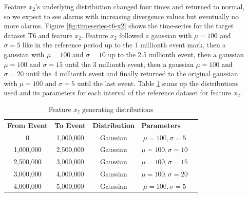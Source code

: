 Feature $x_2$'s underlying distribution changed four times and returned to normal, so we expect to see alarms with increasing divergence values but eventually no more alarms. Figure \ref{fig:timeseries-t6-x2} shows the time-series for the target dataset T6 and feature $x_2$. Feature $x_2$ followed a gaussian with $\mu=100$ and $\sigma=5$ like in the reference period up to the 1 millionth event mark, then a gaussian with $\mu=100$ and $\sigma=10$ up to the 2.5 millionth event, then a gaussian $\mu=100$ and $\sigma=15$ until the 3 millionth event, then a gaussian $\mu=100$ and $\sigma=20$ until the 4 millionth event and finally returned to the original gaussian with $\mu=100$ and $\sigma=5$ until the last event. Table \ref{tbl:multi-feat-x2-changes} sums up the distributions used and its parameters for each interval of the reference dataset for feature $x_2$.
\begin{table}[!htb]
    \begin{center}
    \begin{tabular}{|c|c|c|c|l}
    \cline{1-4}
    \textbf{From Event} & \textbf{To Event} & \textbf{Distribution} & \multicolumn{1}{l|}{\textbf{Parameters}} &  \\ \cline{1-4}
    0                   & 1,000,000         & Gaussian              & $\mu=100, \sigma=5$                      &  \\ \cline{1-4}
    1,000,000           & 2,500,000         & Gaussian              & $\mu=100, \sigma=10$                     &  \\ \cline{1-4}
    2,500,000           & 3,000,000         & Gaussian              & $\mu=100, \sigma=15$                     &  \\ \cline{1-4}
    3,000,000           & 4,000,000         & Gaussian              & $\mu=100, \sigma=20$                      &  \\ \cline{1-4}
    4,000,000           & 5,000,000         & Gaussian              & $\mu=100, \sigma=5$                      &  \\ \cline{1-4}
    \end{tabular}
    \end{center}
    \caption{Feature $x_2$ generating distributions}
    \label{tbl:multi-feat-x2-changes}
\end{table}

